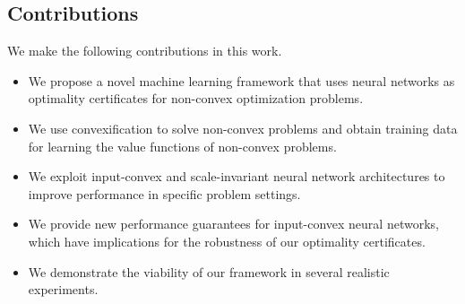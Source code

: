 \documentclass[10pt]{article} %
\theoremstyle{plain}
\theoremstyle{definition}
\theoremstyle{remark}
\begin{document}

\subsection{Contributions}

We make the following contributions in this work.
\begin{itemize}[itemsep=2pt, parsep=0pt]
    \item We propose a novel machine learning framework that uses neural networks as optimality certificates for non-convex optimization problems.
    \item We use convexification to solve non-convex problems and obtain training data for learning the value functions of non-convex problems.
    \item We exploit input-convex and scale-invariant neural network architectures to improve performance in specific problem settings.
    \item We provide new performance guarantees for input-convex neural networks, which have implications for the robustness of our optimality certificates.
    \item We demonstrate the viability of our framework in several realistic experiments.
\end{itemize}


\end{document}
